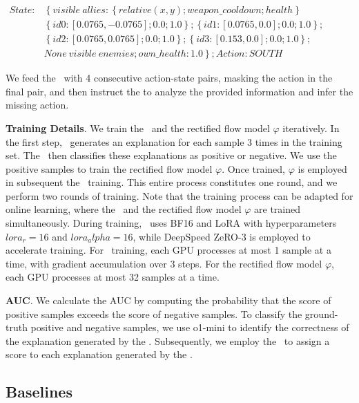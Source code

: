 \emph{$\begin{aligned}State:
&\left\{visible \: allies: \left\{relative \left(x,y\right); weapon\_cooldown; health\right\}\right.\\
&\left\{id 0:\left[ 0.0765, -0.0765\right]; 0.0; 1.0\right\}; \left\{id 1:\left[0.0765, 0.0\right]; 0.0; 1.0\right\}; \\
&\left\{id 2:\left[0.0765, 0.0765\right]; 0.0; 1.0\right\}; \left\{id 3:\left[0.153, 0.0\right]; 0.0; 1.0\right\}; \\
&None \: visible \: enemies; own\_health: 1.0\left.\right\}; Action: SOUTH
\end{aligned}$}

We feed the \elm~with 4 consecutive action-state pairs, masking the action in the final pair, and then instruct the \elm to analyze the provided information and infer the missing action.

\textbf{Training Details}. We train the \elm~and the rectified flow model $\varphi$ iteratively. In the first step, \elm~generates an explanation for each sample 3 times in the training set. The \rlm~then classifies these explanations as positive or negative. We use the positive samples to train the rectified flow model $\varphi$. Once trained, $\varphi$ is employed in subsequent the \elm~training. This entire process constitutes one round, and we perform two rounds of training. Note that the training process can be adapted for online learning, where the \elm~and the rectified flow model $\varphi$ are trained simultaneously. During training, \elm~uses BF16 and LoRA with hyperparameters $lora_r=16$ and $lora_alpha=16$, while DeepSpeed ZeRO-3 is employed to accelerate training. For \elm~training, each GPU processes at most 1 sample at a time, with gradient accumulation over 3 steps. For the rectified flow model $\varphi$, each GPU processes at most 32 samples at a time.


\textbf{AUC}. We calculate the AUC by computing the probability that the score of positive samples exceeds the score of negative samples. To classify the ground-truth positive and negative samples, we use o1-mini to identify the correctness of the explanation generated by the \elm. Subsequently, we employ the \rlm~to assign a score to each explanation generated by the \elm. 


\subsection{Baselines}\label{appx: baselines}


